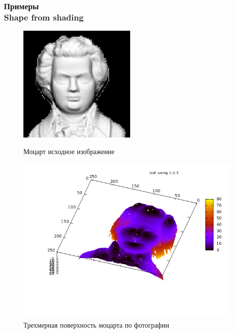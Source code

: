 \documentclass[hyperref={unicode=true},professionalfont]{beamer}
\newcommand{\stamp}{
	\begin{frame}[plain,noframenumbering]
		\begin{table}[h!]
			\flushright
			\vspace{5cm}
			\begin{adjustbox}{max width=0.7\textwidth}
				\begin{tabular}{
					|>{\footnotesize}p{0.8cm}|
					>{\footnotesize}p{0.8cm}|
					>{\footnotesize}p{2.2cm}|
					>{\footnotesize}p{1.1cm}|
					>{\footnotesize}p{0.8cm}|
					>{\footnotesize}p{5cm}|
					>{\footnotesize}p{0.1cm}|
					>{\footnotesize}p{0.1cm}|
					>{\footnotesize}p{0.1cm}|
					>{\footnotesize}p{0.8cm}|
					>{\footnotesize}p{1.4cm}|
				}
					\hline
					&&&&& \multicolumn{6}{>{\footnotesize}c|}{\multirow{3}{*}{\Large 0.043.00.00 ПЗ}} \\ \cline{1-5}
					&&&&& \multicolumn{6}{>{\footnotesize}c|}{} \\ \cline{1-5}
					Изм. & Лист & № Документа & Подпись & Дата & \multicolumn{6}{>{\footnotesize}c|}{} \\ \hline
					\multicolumn{2}{|>{\footnotesize}l|}{Разработал}
                    & Апанович Д.В. &  &  &
                                            \multirow{4}{5cm}{\centering
                                            Параллельный алгоритм
                                            численного решения
                                            анизотропного уравнения эйконала} & \multicolumn{3}{>{\footnotesize}l|}{Лит.} & Лист & Листов \\ \cline{1-5}\cline{7-11}
					\multicolumn{2}{|>{\footnotesize}l|}{Проверил}
                    & Казаков А.Л. &  &  &  & У & & & \insertframenumber & \inserttotalframenumber \\ \cline{1-5}\cline{7-11}
					\multicolumn{2}{|>{\footnotesize}l|}{Нормоконтролер}
                    & Казаков А.Л. &  &  &  & \multicolumn{5}{>{\footnotesize}l|}{} \\ \cline{1-5}
					\multicolumn{2}{|>{\footnotesize}l|}{} &  &  &  &  & \multicolumn{5}{>{\footnotesize}l|}{Кафедра АС, гр. ИСТм-16-1} \\ \cline{1-5}
					\multicolumn{2}{|>{\footnotesize}l|}{Утвердил}
                    & Бахвалов С.В. &  &  &  & \multicolumn{5}{>{\footnotesize}l|}{} \\ \hline

				\end{tabular}
			\end{adjustbox}
		\end{table}

	\end{frame}
}
\renewcommand{\stamp}{}
\begin{document}
\begin{frame}
  \frametitle{Примеры \\ Shape from shading}

  \begin{figure}[ht]
    \begin{minipage}[h]{0.49\linewidth}
      \centering
      \includegraphics[width=0.9\linewidth]{mozart_in.png}
      \hfil \caption{Моцарт исходное изображение}
      \label{fig:ex:1:in}

    \end{minipage}
    \begin{minipage}[ht]{0.49\linewidth}
      \centering
      \includegraphics[width=0.9\linewidth]{mozart.png}
      \hfil \caption{Трехмерная поверхность моцарта по фотографии}
      \label{fig:ex:1:out}

    \end{minipage}
  \end{figure}

\end{frame}
\stamp
\end{document}
